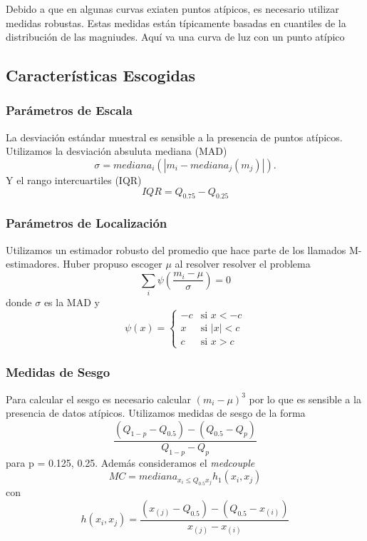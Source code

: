 \documentclass{beamer}
\begin{document}
\begin{frame}
  Debido a que en algunas curvas exiaten puntos atípicos, es necesario utilizar medidas robustas. Estas medidas están típicamente basadas en cuantiles de la distribución de las magniudes. 
  Aquí va una curva de luz con un punto atípico
\end{frame}

\subsection{Características Escogidas}

\begin{frame}
  \frametitle{Parámetros de Escala}
  La desviación estándar muestral es sensible a la presencia de puntos atípicos. Utilizamos la desviación absuluta mediana (MAD)
  \begin{equation}
    \sigma = mediana_i(|m_i-mediana_j(m_j)|).
  \end{equation} 
  Y el rango intercuartiles (IQR)
  \begin{equation}
    IQR = Q_{0.75}-Q_{0.25}
  \end{equation}
\end{frame}

\begin{frame}
  \frametitle{Parámetros de Localización}
  Utilizamos un estimador robusto del promedio que hace parte de los llamados M-estimadores. Huber propuso escoger $\mu$ al resolver resolver el problema 
  \begin{equation}
    \sum_i\psi\left(\frac{m_i-\mu}{\sigma}\right) = 0
  \end{equation}
  donde $\sigma$ es la MAD y 
  \begin{equation}
    \psi(x) = \begin{cases} 
      -c &\mbox{si } x < -c \\ 
      x & \mbox{si } |x|<c\\
      c & \mbox{si } x>c
    \end{cases}
  \end{equation}
\end{frame}

\begin{frame}
  \frametitle{Medidas de Sesgo}
  Para calcular el sesgo es necesario calcular $(m_i-\mu)^3$ por lo que es sensible a la presencia de datos atípicos. Utilizamos medidas de sesgo de la forma 
  \begin{equation}
    \frac{(Q_{1-p}-Q_{0.5})-(Q_{0.5}-Q_p)}{Q_{1-p}-Q_{p}}
  \end{equation}
  para p = 0.125, 0.25. Además consideramos el \textit{medcouple}
  \begin{equation}
    MC = mediana_{x_i\leq Q_{0.5} x_j} h_1(x_i,x_j)
  \end{equation}
  con
  \begin{equation}
    h(x_i,x_j) = \frac{(x_{(j)}-Q_{0.5})-(Q_{0.5}-x_{(i)})}{x_{(j)}-x_{(i)}}
  \end{equation}

\end{frame}
\end{document}
